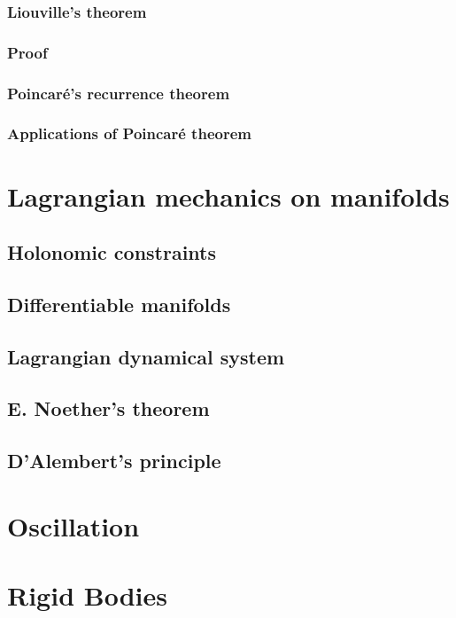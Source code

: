 \documentclass[uplatex, 12pt, dvipdfmx]{jsreport}
\begin{document}
\subsection{Liouville's theorem}

\subsection{Proof}

\subsection{Poincaré's recurrence theorem}

\subsection{Applications of Poincaré theorem}

\chapter{Lagrangian mechanics on manifolds}

\section{Holonomic constraints}

\section{Differentiable manifolds}

\section{Lagrangian dynamical system}

\section{E. Noether's theorem}

\section{D'Alembert's principle}

\chapter{Oscillation}

\chapter{Rigid Bodies}
\end{document}
